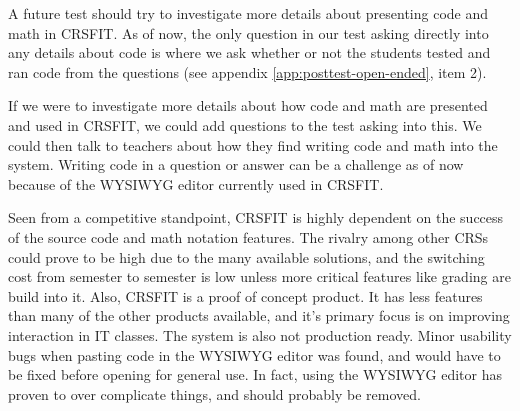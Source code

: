 A future test should try to investigate more details about presenting code and math in CRSFIT. As of now, the only question in our test asking directly into any details about code is where we ask whether or not the students tested and ran code from the questions (see appendix \ref{app:posttest-open-ended}, item 2). 






If we were to investigate more details about how code and math are presented and used in CRSFIT, we could add questions to the test asking into this. We could then talk to teachers about how they find writing code and math into the system. Writing code in a question or answer can be a challenge as of now because of the WYSIWYG editor currently used in CRSFIT. 

Seen from a competitive standpoint, CRSFIT is highly dependent on the success of the source code and math notation features. The rivalry among other CRSs could prove to be high due to the many available solutions, and the switching cost from semester to semester is low unless more critical features like grading are build into it. Also, CRSFIT is a proof of concept product. It has less features than many of the other products available, and it's primary focus is on improving interaction in IT classes. The system is also not production ready. Minor usability bugs when pasting code in the WYSIWYG editor was found, and would have to be fixed before opening for general use. In fact, using the WYSIWYG editor has proven to over complicate things, and should probably be removed. %

